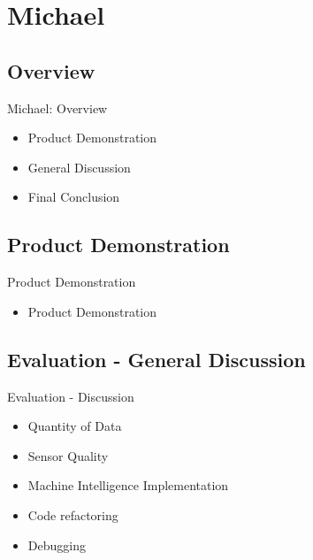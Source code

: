 \section{Michael}
\subsection{Overview}
\begin{frame}{Michael: Overview}
	\begin{itemize}
		\item Product Demonstration
		\item General Discussion
		\item Final Conclusion
	\end{itemize}
\end{frame}



\subsection{Product Demonstration}
\begin{frame}{Product Demonstration}
	\begin{itemize}
		\item Product Demonstration
	\end{itemize}
\end{frame}

\subsection{Evaluation - General Discussion}
\begin{frame}{Evaluation - Discussion}
	\begin{itemize}
		\item Quantity of Data
		\item Sensor Quality
		\item Machine Intelligence Implementation
		\item Code refactoring
		\item Debugging
	\end{itemize}
\end{frame}



